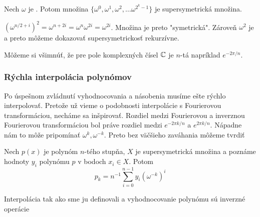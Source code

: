 \begin{lema}
 Nech $\omega$ je .
 Potom množina $\{\omega^0, \omega^1, \omega^2, \dots
 \omega^{2^k-1}\}$ je supersymetrická množina.
\end{lema}
\begin{dokaz}
 $(\omega^{n/2+i})^2 = \omega^{n+2i} = \omega^n \omega^{2i} =
 \omega^{2i}$. Množina je preto "symetrická". Zároveň
 $\omega^2$ je  a preto
 môžeme dokazovať supersymetrickosť rekurzívne.
\end{dokaz}

\begin{poznamka}
    Môžeme si všimnúť, že pre pole komplexných čísel $\mathbb{C}$ je $n$-tá
     napríklad $e^{-2\pi/n}$.
\end{poznamka}

\subsubsection{Rýchla interpolácia polynómov}
Po úspešnom zvládnutí vyhodnocovania a násobenia musíme ešte rýchlo
interpolovať. Pretože už vieme o podobnosti interpolácie s Fourierovou
transformáciou, necháme sa inšpirovať. Rozdiel medzi Fourierovou a
inverznou Fourierovou transformáciou bol práve rozdiel medzi
$e^{-2\pi k/n}$ a $e^{2\pi k/n}$. Nápadne nám to môže pripomínať
$\omega^k, \omega^{-k}$.
Preto bez väčšieho zaváhania môžeme tvrdiť
\begin{lema}
    Nech $p(x)$ je polynóm $n$-tého stupňa, $X$ je supersymetrická
    množina a poznáme hodnoty $y_i$ polynómu $p$ v bodoch $x_i\in X$.
    Potom 
    \begin{equation}
        p_k = n^{-1} \sum_{i=0}^{n-1} y_i (\omega^{-k})^i
    \end{equation}
\end{lema}

\begin{veta}
    Interpolácia tak ako sme ju definovali a vyhodnocovanie polynómu sú
    inverzné operácie
\end{veta}
\begin{dokaz}

\end{dokaz}

